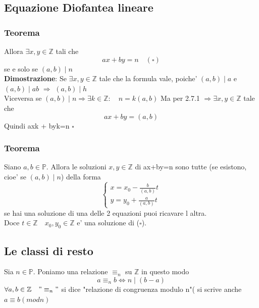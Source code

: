 \documentclass{article}
\begin{document}
    \subsection{Equazione Diofantea lineare}
    \subsubsection{Teorema}
    \begin{flushleft}
     Allora $\exists x,y \in \mathbb{Z}$ tali che
     \begin{equation}
       ax+by=n \quad (\square)
     \end{equation}
     se e solo se $(a,b) \mid n$\\ 
     \textbf{Dimostrazione}: Se $\exists x,y \in \mathbb{Z}$ tale che la formula vale, poiche' $(a,b)\mid a$ e $(a,b) \mid ab$ $\Rightarrow$ $(a,b)\mid h$\\ 
     Viceversa se $(a,b)\mid n \Rightarrow \exists k \in \mathbb{Z}: \quad n=k(a,b)$ Ma per 2.7.1 $\Rightarrow \exists x,y \in \mathbb{Z}$ tale che
     \begin{equation}
       ax+by=(a,b)
     \end{equation}
      Quindi axk + byk=n $\square$
    \end{flushleft}
    \subsubsection{Teorema}
    \begin{flushleft}
      Siano $a,b \in \mathbb{P}$. Allora le soluzioni $x,y \in \mathbb{Z}$ di ax+by=n sono tutte (se esistono, cioe' se $(a,b)\mid n$) della forma \\
      \begin{equation}
        \begin{cases}
          x= x_0 - \frac{b}{(a,b)}t \\
          y= y_0 + \frac{a}{(a,b)}t
        \end{cases}
      \end{equation}
      se hai una soluzione di una delle 2 equazioni puoi ricavare l altra.
      \\ 
      Doce $t \in \mathbb{Z} \quad x_0,y_0 \in \mathbb{Z}$ e' una soluzione di ($\square$).
    \end{flushleft}
     \subsection{Le classi di resto} 
     \begin{flushleft}
       Sia $n \in \mathbb{P}$. Poniamo una relazione $\equiv_n$ su $\mathbb{Z}$ in questo modo
       \begin{equation}
         a \equiv_n b \iff n\mid (b-a)
       \end{equation}
       $\forall a,b \in \mathbb{Z} \quad "\equiv_n"$ si dice "relazione di congruenza modulo n"( si scrive anche $a \equiv b(modn)$
     \end{flushleft}
\end{document}
